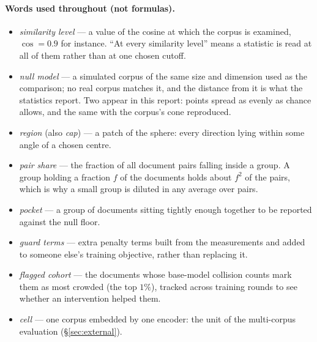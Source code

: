\documentclass[11pt,letterpaper]{article}
\begin{document}
\paragraph{Words used throughout (not formulas).}
\begin{itemize}
  \item \emph{similarity level} --- a value of the cosine at which the
  corpus is examined, $\cos = 0.9$ for instance. ``At every similarity
  level'' means a statistic is read at all of them rather than at one
  chosen cutoff.
  \item \emph{null model} --- a simulated corpus of the same size and
  dimension used as the comparison; no real corpus matches it, and the
distance from it is what the statistics report. Two appear in this
report: points spread as
  evenly as chance allows, and the same with the corpus's cone
  reproduced.
  \item \emph{region} (also \emph{cap}) --- a patch of the sphere: every
  direction lying within some angle of a chosen centre.
  \item \emph{pair share} --- the fraction of all document pairs falling
  inside a group. A group holding a fraction $f$ of the documents holds
  about $f^2$ of the pairs, which is why a small group is diluted in any
  average over pairs.
  \item \emph{pocket} --- a group of documents sitting tightly enough
  together to be reported against the null floor.
  \item \emph{guard terms} --- extra penalty terms built from the
  measurements and added to someone else's training objective, rather
  than replacing it.
  \item \emph{flagged cohort} --- the documents whose base-model
  collision counts mark them as most crowded (the top $1\%$), tracked
  across training rounds to see whether an intervention helped them.
  \item \emph{cell} --- one corpus embedded by one encoder: the unit of
    the multi-corpus evaluation (\S\ref{sec:external}).
\end{itemize}
\end{document}
